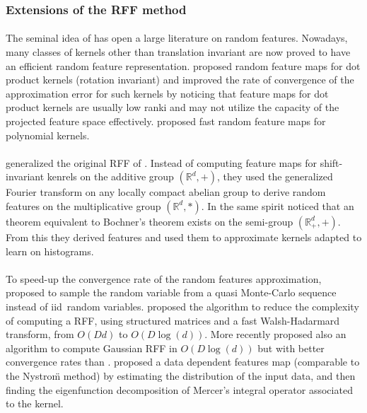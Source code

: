 \subsubsection{Extensions of the RFF method}
\paragraph{}
The seminal idea of \citet{Rahimi2007} has open a large literature on random
features. Nowadays, many classes of kernels other than translation invariant are
now proved to have an efficient random feature representation.
\citet{kar2012random} proposed random feature maps for dot product kernels
(rotation invariant) and \citet{hamid2014compact} improved the rate of
convergence of the approximation error for such kernels by noticing that
feature maps for dot product kernels are usually low ranki and may not utilize
the capacity of the projected feature  space  effectively. 
proposed fast random feature maps for polynomial kernels.
\paragraph{}
 generalized the original \acs{RFF} of \citet{Rahimi2007}.
Instead of computing feature maps for shift-invariant kenrels on the additive
group $(\mathbb{R}^d, +)$, they used the generalized Fourier transform on any
locally compact abelian group to derive random features on the multiplicative
group $(\mathbb{R}^d, *)$. In the same spirit \citet{yang2014random} noticed
that an theorem equivalent to Bochner's theorem exists on the semi-group
$(\mathbb{R}_+^d, +)$. From this they derived  features and
used them to approximate kernels adapted to learn on histograms.
\paragraph{}
To speed-up the convergence rate of the random features approximation,
\citet{yang2014quasi} proposed to sample the random variable from a quasi
Monte-Carlo sequence instead of \acs{iid}~random variables. 
proposed the  algorithm to reduce the complexity of computing a
\acs{RFF}, using structured matrices and a fast Walsh-Hadarmard transform, from
$O(Dd)$ to $O(D\log(d))$. More recently \citet{felix2016orthogonal} proposed
also an algorithm  to compute Gaussian \acs{RFF} in $O(D\log(d))$ but
with better convergence rates than  \citep{Le2013}.
 proposed a data dependent features map (comparable to
the Nystro\"m method) by estimating the distribution of the input data, and
then finding the eigenfunction decomposition of Mercer's integral operator
associated to the kernel.
